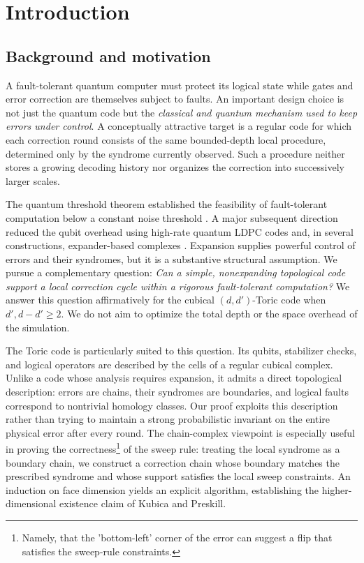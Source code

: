 \section{Introduction}

\subsection{Background and motivation}

A fault-tolerant quantum computer must protect its logical state while gates and error correction are themselves subject to faults. An important design choice is not just the quantum code but the \emph{classical and quantum mechanism used to keep errors under control}. A conceptually attractive target is a regular code for which each correction round consists of the same bounded-depth local procedure, determined only by the syndrome currently observed. Such a procedure neither stores a growing decoding history nor organizes the correction into successively larger scales.

The quantum threshold theorem established the feasibility of fault-tolerant computation below a constant noise threshold \cite{aharonov1999faulttolerant,Ninequ}. A major subsequent direction reduced the qubit overhead using high-rate quantum LDPC codes and, in several constructions, expander-based complexes \cite{gottesman2014faulttolerant,grospellier:tel-03364419,Fawzi_2018,nguyen2025quantumfaulttoleranceconstantspace}. Expansion supplies powerful control of errors and their syndromes, but it is a substantive structural assumption. We pursue a complementary question: \emph{Can a simple, nonexpanding topological code support a local correction cycle within a rigorous fault-tolerant computation?} We answer this question affirmatively for the cubical $(d,d')$-Toric code when $d',d-d'\geq 2$. We do not aim to optimize the total depth or the space overhead of the simulation.

The Toric code is particularly suited to this question. Its qubits, stabilizer checks, and logical operators are described by the cells of a regular cubical complex. Unlike a code whose analysis requires expansion, it admits a direct topological description: errors are chains, their syndromes are boundaries, and logical faults correspond to nontrivial homology classes. Our proof exploits this description rather than trying to maintain a strong probabilistic invariant on the entire physical error after every round. The chain-complex viewpoint is especially useful in proving the correctness\footnote{Namely, that the 'bottom-left' corner of the error can suggest a flip that satisfies the sweep-rule constraints.} of the sweep rule: treating the local syndrome as a boundary chain, we construct a correction chain whose boundary matches the prescribed syndrome and whose support satisfies the local sweep constraints. An induction on face dimension yields an explicit algorithm, establishing the higher-dimensional existence claim of Kubica and Preskill.

